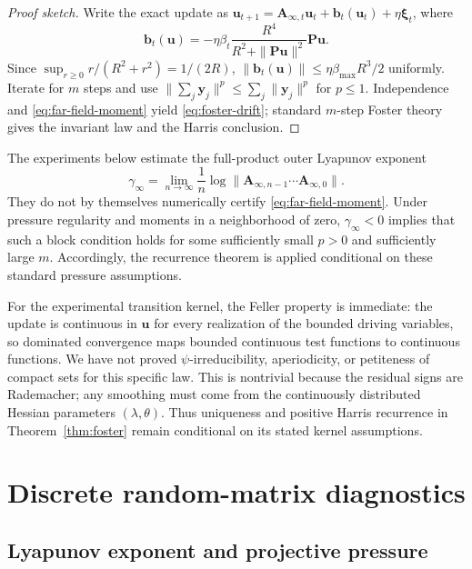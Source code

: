 \documentclass[11pt]{article}
\theoremstyle{definition}
\newcommand{\uvec}{\mathbf u}
\newcommand{\Avec}{\mathbf A}
\newcommand{\Pvec}{\mathbf P}
\newcommand{\xivec}{\boldsymbol\xi}
\begin{document}
\begin{proof}[Proof sketch]
Write the exact update as
$\uvec_{t+1}=\Avec_{\infty,t}\uvec_t+\mathbf b_t(\uvec_t)
+\eta\xivec_t$, where
\[
 \mathbf b_t(\uvec)
 =-\eta\beta_t\frac{R^4}{R^2+\|\Pvec\uvec\|^2}\Pvec\uvec.
\]
Since $\sup_{r\geq0}r/(R^2+r^2)=1/(2R)$,
$\|\mathbf b_t(\uvec)\|\leq\eta\beta_{\max}R^3/2$ uniformly.  Iterate for
$m$ steps and use $\|\sum_j\mathbf y_j\|^p\leq\sum_j\|\mathbf y_j\|^p$
for $p\leq1$.  Independence and \eqref{eq:far-field-moment} yield
\eqref{eq:foster-drift}; standard $m$-step Foster theory gives the invariant
law and the Harris conclusion.
\end{proof}

The experiments below estimate the full-product outer Lyapunov exponent
\begin{equation}
 \gamma_{\infty}
 =\lim_{n\to\infty}\frac1n
 \log\|\Avec_{\infty,n-1}\cdots\Avec_{\infty,0}\|.
 \label{eq:outer-lyapunov}
\end{equation}
They do not by themselves numerically certify
\eqref{eq:far-field-moment}.  Under pressure regularity and moments in a
neighborhood of zero, $\gamma_{\infty}<0$ implies that such a block condition
holds for some sufficiently small $p>0$ and sufficiently large $m$.
Accordingly, the recurrence theorem is applied conditional on these standard
pressure assumptions.

For the experimental transition kernel, the Feller property is immediate:
the update is continuous in $\uvec$ for every realization of the bounded
driving variables, so dominated convergence maps bounded continuous test
functions to continuous functions.  We have not proved
$\psi$-irreducibility, aperiodicity, or petiteness of compact sets for this
specific law.  This is nontrivial because the residual signs are Rademacher;
any smoothing must come from the continuously distributed Hessian parameters
$(\lambda,\theta)$.  Thus uniqueness and positive Harris recurrence in
Theorem~\ref{thm:foster} remain conditional on its stated kernel assumptions.

\section{Discrete random-matrix diagnostics}
\label{sec:matrix-diagnostics}

\subsection{Lyapunov exponent and projective pressure}
\end{document}
